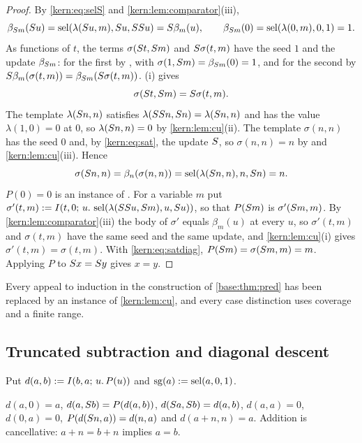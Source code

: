 \begin{proof}
By \eqref{kern:eq:selS} and \cref{kern:lem:comparator}(iii),
\[
 \beta_{S m}(S u)=\operatorname{sel}(\lambda(S u,m),S u,SS u)
 =S\beta_m(u),\qquad
 \beta_{S m}(0)=\operatorname{sel}(\lambda(0,m),0,1)=1 .
\]
As functions of $t$, the terms $\sigma(S t,S m)$ and
$S\sigma(t,m)$ have the seed $1$ and the update $\beta_{S m}$:
for the first by , with
$\sigma(1,S m)=\beta_{S m}(0)=1$, and for the second by
$S\beta_m(\sigma(t,m))=\beta_{S m}(S\sigma(t,m))$.
(i) gives
\begin{equation}
 \sigma(S t,S m)=S\sigma(t,m). \label{kern:eq:sat}
\end{equation}
The template $\lambda(S n,n)$ satisfies
$\lambda(SS n,S n)=\lambda(S n,n)$ and has the value
$\lambda(1,0)=0$ at $0$, so $\lambda(S n,n)=0$ by
\cref{kern:lem:cu}(ii).  The template $\sigma(n,n)$ has the seed $0$ and,
by \eqref{kern:eq:sat}, the update $S$, so $\sigma(n,n)=n$ by
 and \cref{kern:lem:cu}(iii).  Hence
\begin{equation}
 \sigma(S n,n)=\beta_n(\sigma(n,n))=\operatorname{sel}(\lambda(S n,n),n,S n)=n.
 \label{kern:eq:satdiag}
\end{equation}
$P(0)=0$ is an instance of .  For a variable $m$ put
$\sigma'(t,m)\mathrel{:=}I(t,0;\,u.\,\operatorname{sel}(\lambda(SS u,S m),u,S u))$,
so that $P(S m)$ is $\sigma'(S m,m)$.  By
\cref{kern:lem:comparator}(iii) the body of $\sigma'$ equals $\beta_m(u)$
at every $u$, so $\sigma'(t,m)$ and $\sigma(t,m)$ have the same seed and
the same update, and \cref{kern:lem:cu}(i) gives
$\sigma'(t,m)=\sigma(t,m)$.  With \eqref{kern:eq:satdiag},
$P(S m)=\sigma(S m,m)=m$.  Applying $P$ to $S x=S y$ gives
$x=y$.
\end{proof}

Every appeal to induction in the construction of \cref{base:thm:pred} has
been replaced by an instance of \cref{kern:lem:cu}, and every case
distinction uses coverage and a finite range.

\subsection{Truncated subtraction and diagonal descent}
\label{kern:sec:urmonus}

Put $d(a,b)\mathrel{:=}I(b,a;\,u.\,P(u))$ and $\operatorname{sg}(a)\mathrel{:=}
\operatorname{sel}(a,0,1)$.

\begin{lemma}
\label{kern:lem:monus}
$d(a,0)=a$, $d(a,S b)=P(d(a,b))$, $d(S a,S b)=d(a,b)$,
$d(a,a)=0$, $d(0,a)=0$, $P(d(S n,a))=d(n,a)$ and $d(a+n,n)=a$.
Addition is cancellative: $a+n=b+n$ implies $a=b$.
\end{lemma}

